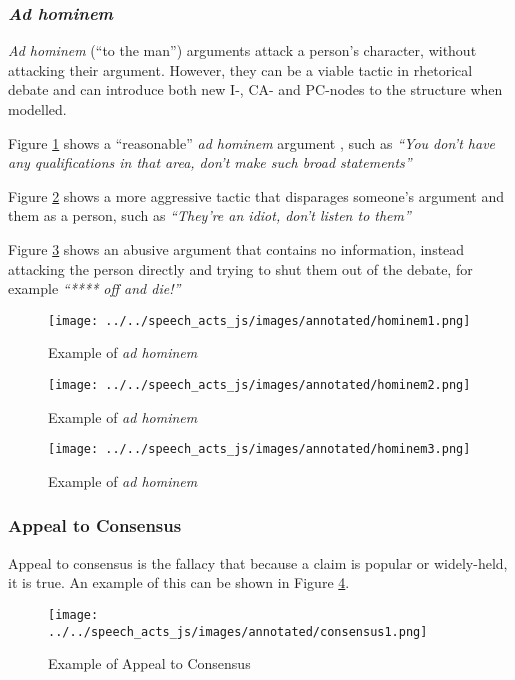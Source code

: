 \subsubsection{\textit{Ad hominem}}
\textit{Ad hominem} (``to the man'') arguments attack a person's character, without attacking their argument. However, they can be a viable tactic in rhetorical debate and can introduce both new I-, CA- and PC-nodes to the structure when modelled.

Figure \ref{figure:hominem1} shows a ``reasonable'' \textit{ad hominem} argument \citep{walton1987}, such as \textit{``You don't have any qualifications in that area, don't make such broad statements''}

Figure \ref{figure:hominem2} shows a more aggressive tactic that disparages someone's argument and them as a person, such as \textit{``They're an idiot, don't listen to them''}

Figure \ref{figure:hominem3} shows an abusive argument that contains no information, instead attacking the person directly and trying to shut them out of the debate, for example \textit{``**** off and die!''}

\begin{figure}[H]
\centering
\texttt{[image: ../../speech\_acts\_js/images/annotated/hominem1.png]}
\caption{Example of \textit{ad hominem}}
\label{figure:hominem1}
\end{figure}

\begin{figure}[H]
\centering
\texttt{[image: ../../speech\_acts\_js/images/annotated/hominem2.png]}
\caption{Example of \textit{ad hominem}}
\label{figure:hominem2}
\end{figure}

\begin{figure}[H]
\centering
\texttt{[image: ../../speech\_acts\_js/images/annotated/hominem3.png]}
\caption{Example of \textit{ad hominem}}
\label{figure:hominem3}
\end{figure}

\subsubsection{Appeal to Consensus}
Appeal to consensus is the fallacy that because a claim is popular or widely-held, it is true. An example of this can be shown in Figure \ref{figure:consensus1}.

\begin{figure}[H]
\centering
\texttt{[image: ../../speech\_acts\_js/images/annotated/consensus1.png]}
\caption{Example of Appeal to Consensus}
\label{figure:consensus1}
\end{figure}

